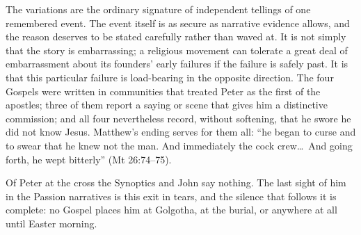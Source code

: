 The variations are the ordinary signature of independent tellings of one
remembered event. The event itself is as secure as narrative evidence
allows, and the reason deserves to be stated carefully rather than waved at.
It is not simply that the story is embarrassing; a religious movement can
tolerate a great deal of embarrassment about its founders' early failures if
the failure is safely past. It is that this particular failure is
load-bearing in the opposite direction. The four Gospels were written in
communities that treated Peter as the first of the apostles; three of them
report a saying or scene that gives him a distinctive commission; and all
four nevertheless record, without softening, that he swore he did not know
Jesus. Matthew's ending serves for them all: ``he began to curse and to swear
that he knew not the man. And immediately the cock crew\ldots\ And going
forth, he wept bitterly'' (Mt 26:74--75).

Of Peter at the cross the Synoptics and John say nothing. The last sight of
him in the Passion narratives is this exit in tears, and the silence that
follows it is complete: no Gospel places him at Golgotha, at the burial, or
anywhere at all until Easter morning.
